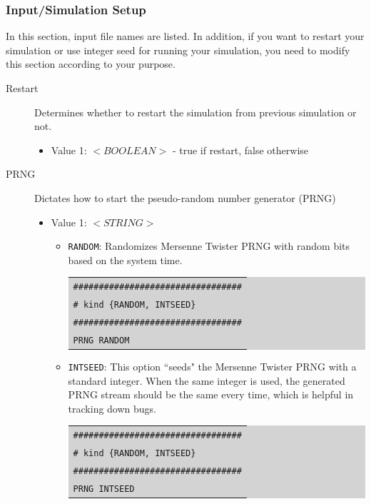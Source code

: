 \subsubsection{Input/Simulation Setup}
In this section, input file names are listed. In addition, if you want to restart your simulation or use integer seed for running your simulation, you need to modify this section according to your purpose.
\begin{description}
\item [Restart] Determines whether to restart the simulation from previous simulation or not.\\
	\begin{itemize}
	\item Value 1: $<BOOLEAN>$ - true if restart, false otherwise\\
	\end{itemize}
\item [PRNG] Dictates how to start the pseudo-random number generator (PRNG)
	\begin{itemize}
	\item Value 1: $<STRING>$
		\begin{itemize}
		\item \texttt{RANDOM}: Randomizes Mersenne Twister PRNG with random bits based on the system time.
		\colorbox{lightgray}{
		\begin{tabular}{l}
		\texttt{\#\#\#\#\#\#\#\#\#\#\#\#\#\#\#\#\#\#\#\#\#\#\#\#\#\#\#\#\#\#\#\#\#}\\
		\texttt{\# kind \{RANDOM, INTSEED\}}\\
		\texttt{\#\#\#\#\#\#\#\#\#\#\#\#\#\#\#\#\#\#\#\#\#\#\#\#\#\#\#\#\#\#\#\#\#}\\
		\texttt{PRNG RANDOM}\\
		\end{tabular}}
		\item \texttt{INTSEED}: This option ``seeds" the Mersenne Twister PRNG with a standard integer. When the same integer is used, the generated PRNG stream should be the same every time, which is helpful in tracking down bugs.\\
		\colorbox{lightgray}{
		\begin{tabular}{l}
		\texttt{\#\#\#\#\#\#\#\#\#\#\#\#\#\#\#\#\#\#\#\#\#\#\#\#\#\#\#\#\#\#\#\#\#}\\
		\texttt{\# kind \{RANDOM, INTSEED\}}\\
		\texttt{\#\#\#\#\#\#\#\#\#\#\#\#\#\#\#\#\#\#\#\#\#\#\#\#\#\#\#\#\#\#\#\#\#}\\
		\texttt{PRNG INTSEED}\\

\end{tabular}}
\end{itemize}
\end{itemize}
\end{description}
